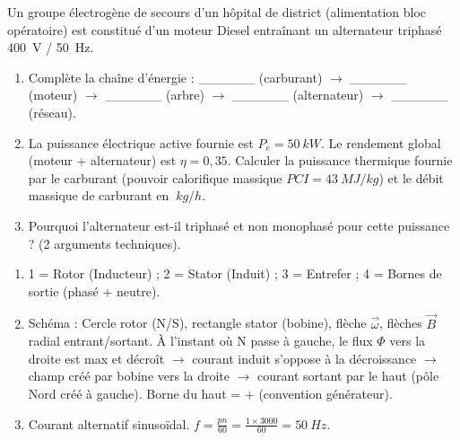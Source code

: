 \documentclass[11pt]{article}
\begin{document}
\begin{exercice}
Un groupe électrogène de secours d'un hôpital de district (alimentation bloc opératoire) est constitué d'un moteur Diesel entraînant un alternateur triphasé \SI{400}{V} / \SI{50}{Hz}.
\begin{enumerate}
    \item Complète la chaîne d'énergie : \_\_\_\_\_\_ (carburant) $\rightarrow$ \_\_\_\_\_\_ (moteur) $\rightarrow$ \_\_\_\_\_\_ (arbre) $\rightarrow$ \_\_\_\_\_\_ (alternateur) $\rightarrow$ \_\_\_\_\_\_ (réseau).
    \item La puissance électrique active fournie est $P_e = \SI{50}{kW}$. Le rendement global (moteur + alternateur) est $\eta = 0,35$. Calculer la puissance thermique fournie par le carburant (pouvoir calorifique massique $PCI = \SI{43}{MJ/kg}$) et le débit massique de carburant en $\SI{}{kg/h}$.
    \item Pourquoi l'alternateur est-il triphasé et non monophasé pour cette puissance ? (2 arguments techniques).
\end{enumerate}
\end{exercice}

\begin{corrige}[Exercice 1]
\begin{enumerate}
    \item 1 = Rotor (Inducteur) ; 2 = Stator (Induit) ; 3 = Entrefer ; 4 = Bornes de sortie (phasé + neutre).
    \item Schéma : Cercle rotor (N/S), rectangle stator (bobine), flèche $\vec{\omega}$, flèches $\vec{B}$ radial entrant/sortant. À l'instant où N passe à gauche, le flux $\Phi$ vers la droite est max et décroît $\rightarrow$ courant induit s'oppose à la décroissance $\rightarrow$ champ créé par bobine vers la droite $\rightarrow$ courant sortant par le haut (pôle Nord créé à gauche). Borne du haut = $+$ (convention générateur).
    \item Courant alternatif sinusoïdal. $f = \frac{p n}{60} = \frac{1 \times 3000}{60} = \SI{50}{Hz}$.
\end{enumerate}
\end{corrige}
\end{document}
